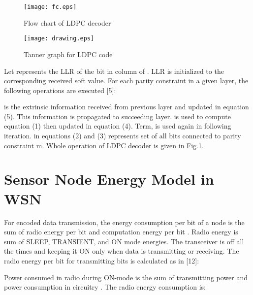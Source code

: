 \documentclass[3p,times,procedia]{elsarticle}
\begin{document}
  \begin{figure}[!ht]
    \begin{minipage}{0.49\linewidth}
\texttt{[image: fc.eps]}
\vspace{-0.4cm}
\caption{Flow chart of LDPC decoder}
    \end{minipage}
\hspace{1.5cm}
    \begin{minipage}{0.49\linewidth}
\texttt{[image: drawing.eps]}
\caption{Tanner graph for LDPC code}
    \end{minipage}
  \end{figure}




Let  represents the LLR of the bit in column  of . LLR is initialized to the corresponding received soft value.
For each parity constraint  in a given layer, the following operations are executed [5]:









 is the extrinsic information received from previous layer and updated in equation (5). This information is propagated to succeeding layer.  is used to compute equation (1) then updated in equation (4). Term,  is used again in following iteration.  in equations  (2) and (3) represents set of all bits connected to parity constraint m. Whole operation of LDPC decoder is given in Fig.1.

\vspace{-0.5cm}
\section{Sensor Node Energy Model in WSN}
\label{sec:pagestyle}
\vspace{-0.3cm}

For encoded data transmission, the energy consumption per bit of a node is the sum of radio energy per bit  and computation energy per bit .
Radio energy is sum of SLEEP, TRANSIENT, and ON mode energies. The transceiver is off all the times and keeping it ON only when data is
transmitting or receiving. The radio energy per bit for transmitting  bits is calculated  as in [12]:
\vspace{-0.3cm}


Power consumed in radio during ON-mode is the sum of transmitting power  and power consumption in circuitry  .
The radio energy consumption is:
\vspace{-0.5cm}
\end{document}
